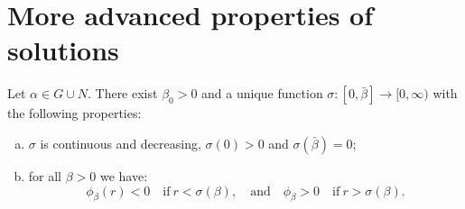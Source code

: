 \section{More advanced properties of solutions}
\begin{lemma}\label{genlem4}
Let $\alpha \in G \cup N$. There exist $\beta_0 > 0$ and a unique function
$\sigma : [0, \bar\beta] \to [0, \infty)$ with the following properties:
\begin{enumerate}[(a)]
\item  $\sigma$ is continuous and decreasing, $\sigma(0) > 0$ and
$\sigma(\bar\beta) = 0$; 
\item for all $\beta > 0$ we have: 
\[
    \phi_\beta(r) < 0 \quad \text{if} ~ r < \sigma(\beta), 
    \quad \text{and} \quad
    \phi_\beta > 0 \quad \text{if} ~ r > \sigma(\beta). 
\]
\end{enumerate}
\end{lemma}
